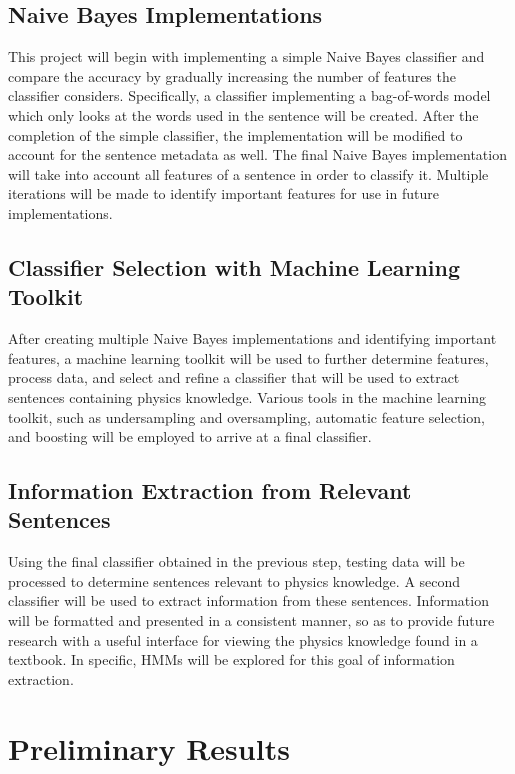 \documentclass{article} %
\begin{document}
\subsection{Naive Bayes Implementations}

This project will begin with implementing a simple Naive Bayes classifier and compare the accuracy by gradually increasing the number of features the classifier considers. Specifically, a classifier implementing a bag-of-words model which only looks at the words used in the sentence will be created. After the completion of the simple classifier, the implementation will be modified to account for the sentence metadata as well. The final Naive Bayes implementation will take into account all features of a sentence in order to classify it. Multiple iterations will be made to identify important features for use in future implementations.

\subsection{Classifier Selection with Machine Learning Toolkit}

After creating multiple Naive Bayes implementations and identifying important features, a machine learning toolkit will be used to further determine features, process data, and select and refine a classifier that will be used to extract sentences containing physics knowledge. Various tools in the machine learning toolkit, such as undersampling and oversampling, automatic feature selection, and boosting will be employed to arrive at a final classifier.

\subsection{Information Extraction from Relevant Sentences}

Using the final classifier obtained in the previous step, testing data will be processed to determine sentences relevant to physics knowledge. A second classifier will be used to extract information from these sentences. Information will be formatted and presented in a consistent manner, so as to provide future research with a useful interface for viewing the physics knowledge found in a textbook. In specific, HMMs will be explored for this goal of information extraction.

\section{Preliminary Results}
\end{document}
